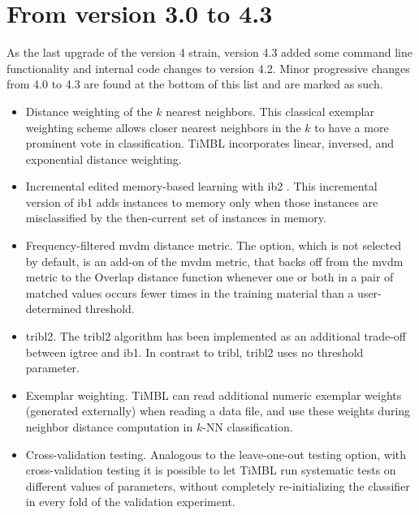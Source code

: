 \documentclass{report}
\begin{document}
\section{From version 3.0 to 4.3}

As the last upgrade of the version 4 strain, version 4.3 added some
command line functionality and internal code changes to version
4.2. Minor progressive changes from 4.0 to 4.3 are found at the bottom
of this list and are marked as such.

\begin{itemize}

\item Distance weighting of the $k$ nearest neighbors. This classical
exemplar weighting scheme \cite{Dudani76} allows closer nearest
neighbors in the $k$ to have a more prominent vote in
classification. TiMBL incorporates linear, inversed, and exponential
distance weighting.

\item Incremental edited memory-based learning with {\sc ib2}
\cite{Aha+91}. This incremental version of {\sc ib1} adds instances to
memory only when those instances are misclassified by the then-current
set of instances in memory.

\item Frequency-filtered {\sc mvdm} distance metric. The option, which is
not selected by default, is an add-on of the {\sc mvdm} metric, that backs
off from the {\sc mvdm} metric to the Overlap distance function whenever one
or both in a pair of matched values occurs fewer times in the training
material than a user-determined threshold.

\item {\sc tribl2}. The {\sc tribl2} algorithm has been implemented
as an additional trade-off between {\sc igtree} and {\sc ib1}. In
contrast to {\sc tribl}, {\sc tribl2} uses no threshold parameter.

\item Exemplar weighting. TiMBL can read additional numeric exemplar
weights (generated externally) when reading a data file, and use these
weights during neighbor distance computation in $k$-NN classification.

\item Cross-validation testing. Analogous to the leave-one-out testing
option, with cross-validation testing it is possible to let TiMBL run
systematic tests on different values of parameters, without completely
re-initializing the classifier in every fold of the validation experiment.


\end{itemize}
\end{document}
